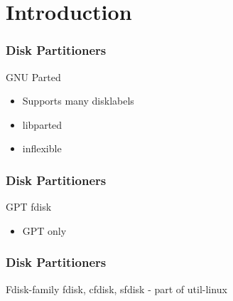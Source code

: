 
\section{Introduction}

\begin{frame}\frametitle{Disk Partitioners}
  GNU Parted
  \begin{itemize}
  \item Supports many disklabels
  \item libparted
  \item inflexible
  \end{itemize}
\end{frame}

\begin{frame}\frametitle{Disk Partitioners}
  GPT fdisk
  \begin{itemize}
  \item GPT only 
  \end{itemize}
\end{frame}

\begin{frame}\frametitle{Disk Partitioners}
  \begin{block}{Fdisk-family}
    fdisk, cfdisk, sfdisk - part of util-linux
  \end{block}
\end{frame}
